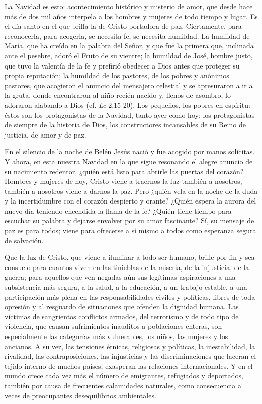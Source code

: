 \begin{body}
\begin{body}
La Navidad es esto: acontecimiento histórico y misterio de amor, que desde hace más de dos mil años interpela a los hombres y mujeres de todo tiempo y lugar. Es el día santo en el que brilla la  de Cristo portadora de paz. Ciertamente, para reconocerla, para acogerla, se necesita fe, se necesita humildad. La humildad de María, que ha creído en la palabra del Señor, y que fue la primera que, inclinada ante el pesebre, adoró el Fruto de su vientre; la humildad de José, hombre justo, que tuvo la valentía de la fe y prefirió obedecer a Dios antes que proteger su propia reputación; la humildad de los pastores, de los pobres y anónimos pastores, que acogieron el anuncio del mensajero celestial y se apresuraron a ir a la gruta, donde encontraron al niño recién nacido y, llenos de asombro, lo adoraron alabando a Dios (cf. \emph{Lc} 2,15-20). Los pequeños, los pobres en espíritu: éstos son los protagonistas de la Navidad, tanto ayer como hoy; los protagonistas de siempre de la historia de Dios, los constructores incansables de su Reino de justicia, de amor y de paz.

En el silencio de la noche de Belén Jesús nació y fue acogido por manos solícitas. Y ahora, en esta nuestra Navidad en la que sigue resonando el alegre anuncio de su nacimiento redentor, ¿quién está listo para abrirle las puertas del corazón? Hombres y mujeres de hoy, Cristo viene a traernos la luz también a nosotros, también a nosotros viene a darnos la paz. Pero ¿quién vela en la noche de la duda y la incertidumbre con el corazón despierto y orante? ¿Quién espera la aurora del nuevo día teniendo encendida la llama de la fe? ¿Quién tiene tiempo para escuchar su palabra y dejarse envolver por su amor fascinante? Sí, su mensaje de paz es para todos; viene para ofrecerse a sí mismo a todos como esperanza segura de salvación.

Que la luz de Cristo, que viene a iluminar a todo ser humano, brille por fin y sea consuelo para cuantos viven en las tinieblas de la miseria, de la injusticia, de la guerra; para aquellos que ven negadas aún sus legítimas aspiraciones a una subsistencia más segura, a la salud, a la educación, a un trabajo estable, a una participación más plena en las responsabilidades civiles y políticas, libres de toda opresión y al resguardo de situaciones que ofenden la dignidad humana. Las víctimas de sangrientos conflictos armados, del terrorismo y de todo tipo de violencia, que causan sufrimientos inauditos a poblaciones enteras, son especialmente las categorías más vulnerables, los niños, las mujeres y los ancianos. A su vez, las tensiones étnicas, religiosas y políticas, la inestabilidad, la rivalidad, las contraposiciones, las injusticias y las discriminaciones que laceran el tejido interno de muchos países, exasperan las relaciones internacionales. Y en el mundo crece cada vez más el número de emigrantes, refugiados y deportados, también por causa de frecuentes calamidades naturales, como consecuencia a veces de preocupantes desequilibrios ambientales.


\end{body}
\end{body}
